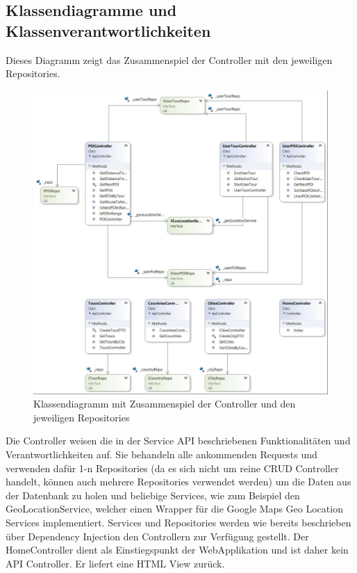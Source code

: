 \documentclass[a4paper,10pt,xetex]{article}
\begin{document}
\subsection{Klassendiagramme und Klassenverantwortlichkeiten}\label{klassendiagramme}
Dieses Diagramm zeigt das Zusammenspiel der Controller mit den jeweiligen Repositories.

\begin{figure}
  \centering
  \includegraphics{klassendiagramm_backend1}
  \caption{Klassendiagramm mit Zusammenspiel der Controller und den jeweiligen Repositories}
\end{figure}

Die Controller weisen die in der Service API beschriebenen Funktionalit\"aten und Verantwortlichkeiten auf. Sie
behandeln alle ankommenden Requests und verwenden daf\"ur 1-n Repositories (da es sich nicht um reine CRUD Controller
handelt, k\"onnen auch mehrere Repositories verwendet werden) um die Daten aus der Datenbank zu holen und beliebige
Services, wie zum Beispiel den GeoLocationService, welcher einen Wrapper f\"ur die Google Maps Geo Location Services
implementiert. Services und Repositories werden wie bereits beschrieben \"uber Dependency Injection den Controllern zur
Verf\"ugung gestellt. Der HomeController dient als Einstiegspunkt der WebApplikation und ist daher kein API Controller.
Er liefert eine HTML View zur\"uck.
\end{document}
